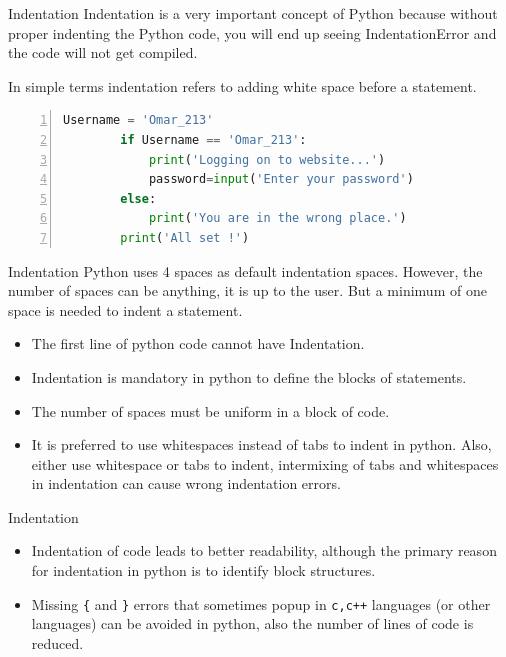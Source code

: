 \begin{frame}[fragile]{Indentation}
    Indentation is a very important concept of Python because without proper indenting the Python code, 
    you will end up seeing IndentationError and the code will not get compiled.



    In simple terms indentation refers to adding white space before a statement.
    \pause
    \begin{lstlisting}[numbers=left,showstringspaces=false,language=python]
        Username = 'Omar_213'  
        if Username == 'Omar_213': 
            print('Logging on to website...')
            password=input('Enter your password') 
        else: 
            print('You are in the wrong place.') 
        print('All set !')
        \end{lstlisting}        
\end{frame}
\begin{frame}[fragile]{Indentation}
Python uses 4 spaces as default indentation spaces. However, the number of spaces can be anything, it is up to the user. 
But a minimum of one space is needed to indent a statement.
\begin{itemize}
    \item The first line of python code cannot have Indentation.
    \item Indentation is mandatory in python to define the blocks of statements.
    \item The number of spaces must be uniform in a block of code.
    \item It is preferred to use whitespaces instead of tabs to indent in python. Also, either use whitespace or tabs to indent, intermixing of tabs and whitespaces in indentation can cause wrong indentation errors.
\end{itemize}
\end{frame}
\begin{frame}[fragile]{Indentation}
\begin{itemize}
    \item Indentation of code leads to better readability, although the primary reason for indentation in python is to identify block structures.
    \item Missing \verb|{| and \verb|}| errors that sometimes popup in \verb|c,c++| languages (or other languages) can be avoided in python, also the number of lines of code is reduced.
\end{itemize}
\end{frame}
